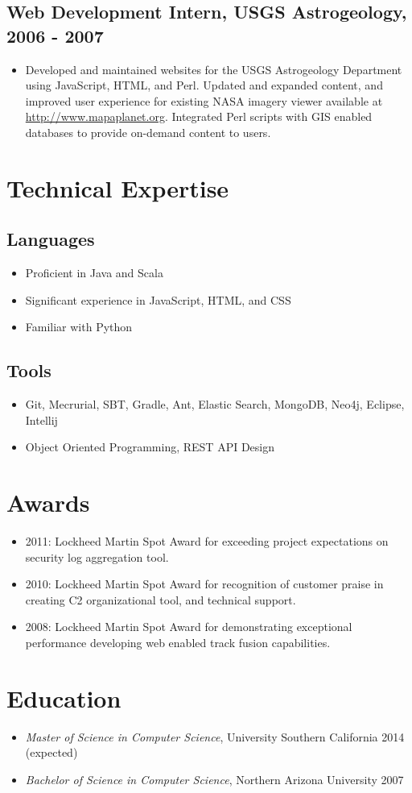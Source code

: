 \documentclass[11pt]{article}
\begin{document}
\subsection*{Web Development Intern, USGS Astrogeology, 2006 - 2007}
\label{sec-1-4}

\begin{itemize}
\item Developed and maintained websites for the USGS Astrogeology Department using JavaScript, HTML, and Perl. Updated and expanded content, and improved user experience for existing NASA imagery viewer available at \href{http://www.mapaplanet.org}{http://www.mapaplanet.org}. Integrated Perl scripts with GIS enabled databases to provide on-demand content to users.
\end{itemize}
\section*{Technical Expertise}
\label{sec-2}
\subsection*{Languages}
\label{sec-2-1}

\begin{itemize}
\item Proficient in Java and Scala
\item Significant experience in JavaScript, HTML, and CSS
\item Familiar with Python
\end{itemize}
\subsection*{Tools}
\label{sec-2-2}

\begin{itemize}
\item Git, Mecrurial, SBT, Gradle, Ant, Elastic Search, MongoDB, Neo4j, Eclipse, Intellij
\item Object Oriented Programming, REST API Design
\end{itemize}
\section*{Awards}
\label{sec-3}

\begin{itemize}
\item 2011: Lockheed Martin Spot Award for exceeding project expectations on security log aggregation tool.
\item 2010: Lockheed Martin Spot Award for recognition of customer praise in creating C2 organizational tool, and technical support.
\item 2008: Lockheed Martin Spot Award for demonstrating exceptional performance developing web enabled track fusion capabilities.
\end{itemize}
\section*{Education}
\label{sec-4}

\begin{itemize}
\item \emph{Master of Science in Computer Science}, University Southern California 2014 (expected)
\item \emph{Bachelor of Science in Computer Science}, Northern Arizona University 2007
\end{itemize}
\end{document}
